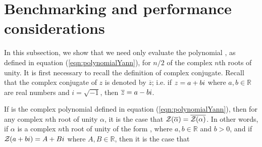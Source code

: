 
\section{Benchmarking and performance considerations}
\label{sec:fftbor:benchmarking}

In this subsection, we show that we need only evaluate the polynomial
\emZ{}, as defined in
equation (\ref{eqn:polynomialYann}), for $n/2$ of the complex $n$th roots
of unity. It is first necessary to recall the definition of complex
conjugate.
Recall that the complex conjugate of $z$ is denoted by $\overline{z}$;
i.e. if $z=a+bi$ where $a,b \in \mathbb{R}$ are real numbers and
$i = \sqrt{-1}$,  then $\overline{z} = a-bi$.

 If \emZ{} is the complex polynomial defined in
equation (\ref{eqn:polynomialYann}), then for any complex $n$th root of
unity $\alpha$, it is the case that ${\mathcal Z}_{}(\overline{\alpha}) =
\overline{{\mathcal Z}_{}(\alpha)}$. In other words, if $\alpha$ is a complex $n$th root
of unity of the form \aPbi, where $a,b \in \mathbb{R}$ and $b>0$, and
if ${\mathcal Z}_{}(a+bi) = A + Bi$ where $A,B \in \mathbb{R}$, then it is the case that

